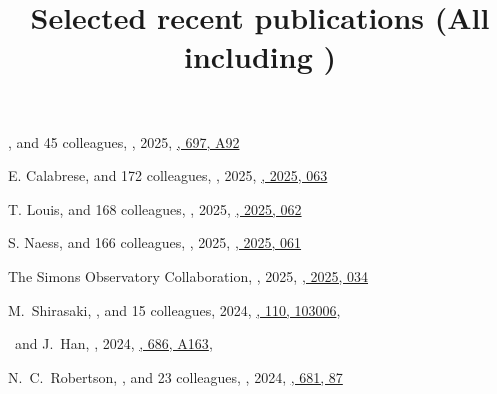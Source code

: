 \title{Selected recent publications {\small (All including \myself)}}


\noindent



\begin{etaremune}

\item
\myself, and 45 colleagues,
,
2025, \href{https://ui.adsabs.harvard.edu/abs/2025A&A...697A..92S}{\aap, 697, A92}

\item
E. Calabrese, and 172 colleagues,
,
2025, \href{https://ui.adsabs.harvard.edu/abs/2025JCAP...11..063C}{\jcap, 2025, 063}

\item
T. Louis, and 168 colleagues,
,
2025, \href{https://ui.adsabs.harvard.edu/abs/2025JCAP...11..062L}{\jcap, 2025, 062}

\item
S. Naess, and 166 colleagues,
,
2025, \href{https://ui.adsabs.harvard.edu/abs/2025JCAP...11..061N}{\jcap, 2025, 061}

\item
The Simons Observatory Collaboration,
,
2025, \href{https://ui.adsabs.harvard.edu/abs/2025JCAP...08..034A}{\jcap, 2025, 034}

\item
M.~Shirasaki, \myself, and 15 colleagues,
2024, \href{https://ui.adsabs.harvard.edu/abs/2024arXiv240708201S/abstract}{\prd, 110, 103006},

\item
\myself\ and J.~Han,
,
2024, \href{https://ui.adsabs.harvard.edu/abs/2024A&A...686A.163S/abstract}{\aap, 686, A163},
   
\item
N.~C.~Robertson, \myself, and 23 colleagues,
,
2024, \href{https://ui.adsabs.harvard.edu/abs/2024A&A...681A..87R/abstract}{\aap, 681, 87}


\end{etaremune}
